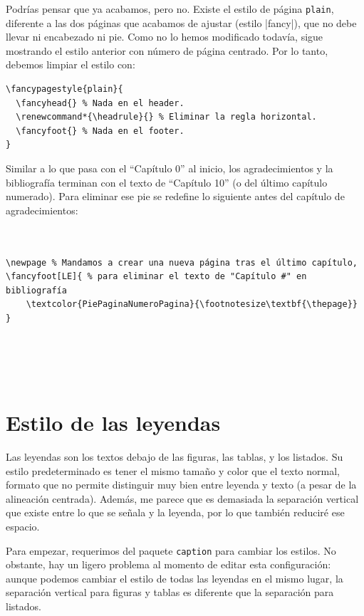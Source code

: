 Podrías pensar que ya acabamos, pero no. Existe el estilo de página \texttt{plain}, diferente a las dos páginas que acabamos de ajustar (estilo |fancy|), que no debe llevar ni encabezado ni pie. Como no lo hemos modificado todavía, sigue mostrando el estilo anterior con número de página centrado. Por lo tanto, debemos limpiar el estilo con:

\begin{lstlisting}[style=latex]
\fancypagestyle{plain}{
  \fancyhead{} % Nada en el header.
  \renewcommand*{\headrule}{} % Eliminar la regla horizontal.
  \fancyfoot{} % Nada en el footer.
}
\end{lstlisting}

Similar a lo que pasa con el ``Capítulo 0'' al inicio, los agradecimientos y la bibliografía terminan con el texto de ``Capítulo 10'' (o del último capítulo numerado). Para eliminar ese pie se redefine lo siguiente antes del capítulo de agradecimientos:

\begin{lstlisting}[style=latex]


\newpage % Mandamos a crear una nueva página tras el último capítulo,
\fancyfoot[LE]{ % para eliminar el texto de "Capítulo #" en bibliografía
	\textcolor{PiePaginaNumeroPagina}{\footnotesize\textbf{\thepage}}
}





\end{lstlisting}



\section{Estilo de las leyendas}
\label{sec:estilo_de_las_leyendas}



Las leyendas son los textos debajo de las figuras, las tablas, y los listados. Su estilo predeterminado es tener el mismo tamaño y color que el texto normal, formato que no permite distinguir muy bien entre leyenda y texto (a pesar de la alineación centrada). Además, me parece que es demasiada la separación vertical que existe entre lo que se señala y la leyenda, por lo que también reduciré ese espacio.

Para empezar, requerimos del paquete \texttt{caption} para cambiar los estilos. No obstante, hay un ligero problema al momento de editar esta configuración: aunque podemos cambiar el estilo de todas las leyendas en el mismo lugar, la separación vertical para figuras y tablas es diferente que la separación para listados.

